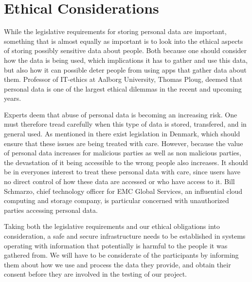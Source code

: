 
\section{Ethical Considerations}
\label{sec:ethical_considerations}

While the legislative requirements for storing personal data are important, something that is almost equally as important is to look into the ethical aspects of storing possibly sensitive data about people. Both because one should consider how the data is being used, which implications it has to gather and use this data, but also how it can possible deter people from using apps that gather data about them. Professor of IT-ethics at Aalborg University, Thomas Ploug, deemed that personal data is one of the largest ethical dilemmas in the recent and upcoming years.


Experts deem that abuse of personal data is becoming an increasing risk. One must therefore tread carefully when this type of data is stored, transfered, and in general used. As mentioned in  there exist legislation in Denmark, which should ensure that these issues are being treated with care. However, because the value of personal data increases for malicious parties as well as non malicious parties, the devastation of it being accessible to the wrong people also increases. It should be in everyones interest to treat these personal data with care, since users have no direct control of how these data are accessed or who have access to it. Bill Schmarzo, chief technology officer for EMC Global Services, an influential cloud computing and storage company, is particular concerned with unauthorized parties accessing personal data.


Taking both the legislative requirements and our ethical obligations into consideration, a safe and secure infrastructure needs to be established in systems operating with information that potentially is harmful to the people it was gathered from. We will have to be considerate of the participants by informing them about how we use and process the data they provide, and obtain their consent before they are involved in the testing of our project. 